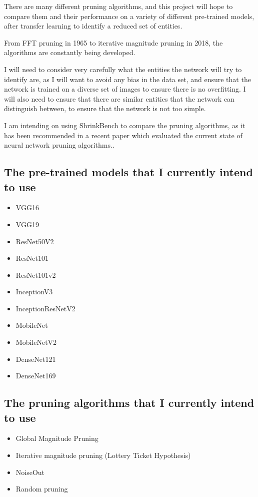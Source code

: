 \documentclass{article}
\begin{document}
There are many different pruning algorithms, and this project will hope to compare
them and their performance on a variety of different pre-trained models, after
transfer learning to identify a reduced set of entities.

From FFT pruning in 1965\cite{FFT} to iterative magnitude pruning in 2018\cite{LotteryTicket},
the algorithms are constantly being developed.

I will need to consider very carefully what the entities the network will try
to identify are, as I will want to avoid any bias in the data set, and
ensure that the network is trained on a diverse set of images to ensure there is no
overfitting. I will also need to ensure that there are similar entities that the
network can distinguish between, to ensure that the network is not too simple.

I am intending on using ShrinkBench\cite{ShrinkBench} to compare the pruning algorithms,
as it has been recommended in a recent paper which evaluated the current state of neural network pruning algorithms.\cite{DBLP:journals/corr/abs-2003-03033}.

\pagebreak

\subsection{The pre-trained models that I currently intend to use}
\begin{itemize}
	\item VGG16
	\item VGG19
	\item ResNet50V2
	\item ResNet101
	\item ResNet101v2
	\item InceptionV3
	\item InceptionResNetV2
	\item MobileNet
	\item MobileNetV2
	\item DenseNet121
	\item DenseNet169
\end{itemize}

\subsection{The pruning algorithms that I currently intend to use}
\begin{itemize}
	\item Global Magnitude Pruning \cite{gupta2022global}
	\item Iterative magnitude pruning (Lottery Ticket Hypothesis)\cite{LotteryTicket}
	\item NoiseOut\cite{DBLP:journals/corr/BabaeizadehSC16}
	\item Random pruning
\end{itemize}
\end{document}
